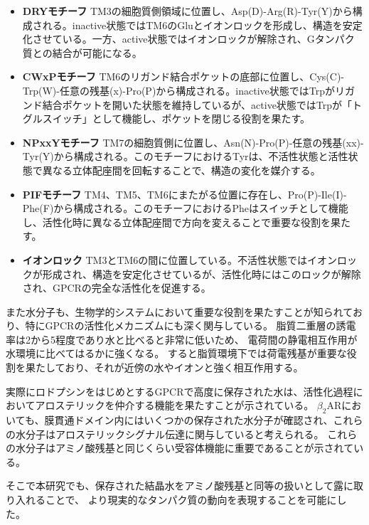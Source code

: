 \begin{itemize}
  \item \textbf{DRYモチーフ}  
  TM3の細胞質側領域に位置し、Asp(D)-Arg(R)-Tyr(Y)から構成される。inactive状態ではTM6のGluとイオンロックを形成し、構造を安定化させている。一方、active状態ではイオンロックが解除され、Gタンパク質との結合が可能になる。

  \item \textbf{CWxPモチーフ}  
  TM6のリガンド結合ポケットの底部に位置し、Cys(C)-Trp(W)-任意の残基(x)-Pro(P)から構成される。inactive状態ではTrpがリガンド結合ポケットを開いた状態を維持しているが、active状態ではTrpが「トグルスイッチ」として機能し、ポケットを閉じる役割を果たす。

  \item \textbf{NPxxYモチーフ}  
  TM7の細胞質側に位置し、Asn(N)-Pro(P)-任意の残基(xx)-Tyr(Y)から構成される。このモチーフにおけるTyrは、不活性状態と活性状態で異なる立体配座間を回転することで、構造の変化を媒介する。

  \item \textbf{PIFモチーフ}  
  TM4、TM5、TM6にまたがる位置に存在し、Pro(P)-Ile(I)-Phe(F)から構成される。このモチーフにおけるPheはスイッチとして機能し、活性化時に異なる立体配座間で方向を変えることで重要な役割を果たす。

  \item \textbf{イオンロック}  
  TM3とTM6の間に位置している。不活性状態ではイオンロックが形成され、構造を安定化させているが、活性化時にはこのロックが解除され、GPCRの完全な活性化を促進する。
\end{itemize}

また水分子も、生物学的システムにおいて重要な役割を果たすことが知られており、特にGPCRの活性化メカニズムにも深く関与している。
脂質二重層の誘電率は2から5程度であり水と比べると非常に低いため、
電荷間の静電相互作用が水環境に比べてはるかに強くなる。
すると脂質環境下では荷電残基が重要な役割を果たしており、それが近傍の水やイオンと強く相互作用する。

実際にロドプシンをはじめとするGPCRで高度に保存された水は、活性化過程においてアロステリックを仲介する機能を果たすことが示されている\cite{angel2009conserved}。
$\beta_2$ARにおいても、膜貫通ドメイン内にはいくつかの保存された水分子が確認され、これらの水分子はアロステリックシグナル伝達に関与していると考えられる。
これらの水分子はアミノ酸残基と同じくらい受容体機能に重要であることが示されている。

そこで本研究でも、保存された結晶水をアミノ酸残基と同等の扱いとして露に取り入れることで、
より現実的なタンパク質の動向を表現することを可能にした。
